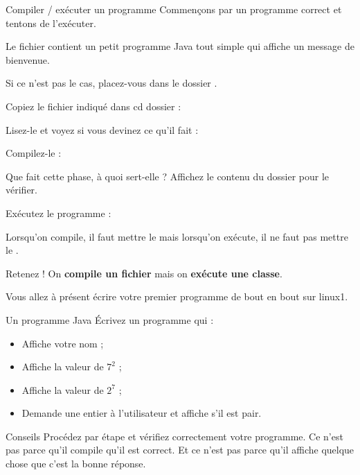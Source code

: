 \documentclass[a4paper,11pt]{style-esi/td}
\begin{document}
	\begin{Tutoriel}{Compiler / exécuter un programme} 
		Commençons par un programme correct et tentons de l'exécuter.  
      
        Le fichier  
        contient un petit programme Java tout simple qui affiche un message de bienvenue. 
        
		\begin{steps}	
        \item 
            Si ce n'est pas le cas, placez-vous dans le dossier .
        \item 
            Copiez le fichier indiqué dans cd dossier :
        \item 
            Lisez-le et voyez si vous devinez ce qu'il fait : 
        \item 
            Compilez-le : 
        \item 
            Que fait cette phase, à quoi sert-elle ?
            Affichez le contenu du dossier pour le vérifier.
		\item Exécutez le programme : 
		\end{steps}			
	\end{Tutoriel}

    Lorsqu'on compile, il faut mettre le  
    mais lorsqu'on exécute, 
    il ne faut pas mettre le .

    \begin{alerttbox}{Retenez !} 
        On \textbf{compile un fichier} mais on \textbf{exécute une classe}.
    \end{alerttbox}

	Vous allez à présent écrire votre premier programme de bout en bout sur linux1. 
	
	\begin{Exercice}{Un programme Java}
		Écrivez un programme qui :
		\begin{itemize}
		\item Affiche votre nom ;
		\item Affiche la valeur de $7^2$ ;
		\item Affiche la valeur de $2^7$ ;
		\item Demande une entier à l'utilisateur et affiche s'il est pair. 
		\end{itemize}
	\end{Exercice}

	\begin{alerttbox}{Conseils}
		Procédez par étape et vérifiez correctement votre programme.
		Ce n'est pas parce qu'il compile qu'il est correct.
		Et ce n'est pas parce qu'il affiche quelque chose que c'est la bonne réponse.
	\end{alerttbox}
\end{document}
